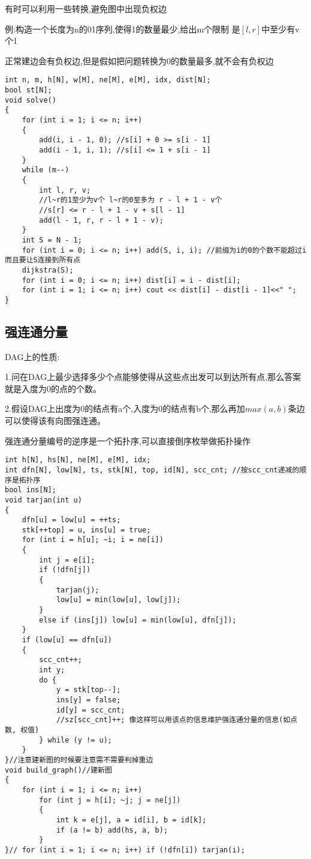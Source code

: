 \documentclass[a4paper, fontset=none]{ctexart}
\begin{document}
有时可以利用一些转换,避免图中出现负权边

例:构造一个长度为n的01序列,使得1的数量最少,给出m个限制 是$[l, r]$中至少有v个1

正常建边会有负权边,但是假如把问题转换为0的数量最多,就不会有负权边

\begin{verbatim}
int n, m, h[N], w[M], ne[M], e[M], idx, dist[N];
bool st[N];
void solve()
{
    for (int i = 1; i <= n; i++)
    {
        add(i, i - 1, 0); //s[i] + 0 >= s[i - 1]
        add(i - 1, i, 1); //s[i] <= 1 + s[i - 1]
    }
    while (m--)
    {
        int l, r, v;
        //l~r的1至少为v个 l~r的0至多为 r - l + 1 - v个
        //s[r] <= r - l + 1 - v + s[l - 1]
        add(l - 1, r, r - l + 1 - v);
    }
    int S = N - 1;
    for (int i = 0; i <= n; i++) add(S, i, i); //前缀为i的0的个数不能超过i 而且要让S连接到所有点
    dijkstra(S);
    for (int i = 0; i <= n; i++) dist[i] = i - dist[i];
    for (int i = 1; i <= n; i++) cout << dist[i] - dist[i - 1]<<" ";
}
\end{verbatim}
\subsection{强连通分量}

DAG上的性质:

1.问在DAG上最少选择多少个点能够使得从这些点出发可以到达所有点,那么答案就是入度为0的点的个数。

2.假设DAG上出度为0的结点有a个,入度为0的结点有b个,那么再加$max(a, b)$条边可以使得该有向图强连通。

强连通分量编号的逆序是一个拓扑序,可以直接倒序枚举做拓扑操作

\begin{verbatim}
int h[N], hs[N], ne[M], e[M], idx;
int dfn[N], low[N], ts, stk[N], top, id[N], scc_cnt; //按scc_cnt递减的顺序是拓扑序
bool ins[N];
void tarjan(int u)
{
    dfn[u] = low[u] = ++ts;
    stk[++top] = u, ins[u] = true;
    for (int i = h[u]; ~i; i = ne[i])
    {
        int j = e[i];
        if (!dfn[j])
        {
            tarjan(j);
            low[u] = min(low[u], low[j]);
        }
        else if (ins[j]) low[u] = min(low[u], dfn[j]);
    }
    if (low[u] == dfn[u])
    {
        scc_cnt++;
        int y;
        do {
            y = stk[top--];
            ins[y] = false;
            id[y] = scc_cnt;
            //sz[scc_cnt]++; 像这样可以用该点的信息维护强连通分量的信息(如点数, 权值)
        } while (y != u);
    }
}//注意建新图的时候要注意需不需要判掉重边
void build_graph()//建新图
{
    for (int i = 1; i <= n; i++)
        for (int j = h[i]; ~j; j = ne[j])
        {
            int k = e[j], a = id[i], b = id[k];
            if (a != b) add(hs, a, b);
        }
}// for (int i = 1; i <= n; i++) if (!dfn[i]) tarjan(i);
\end{verbatim}
\end{document}
